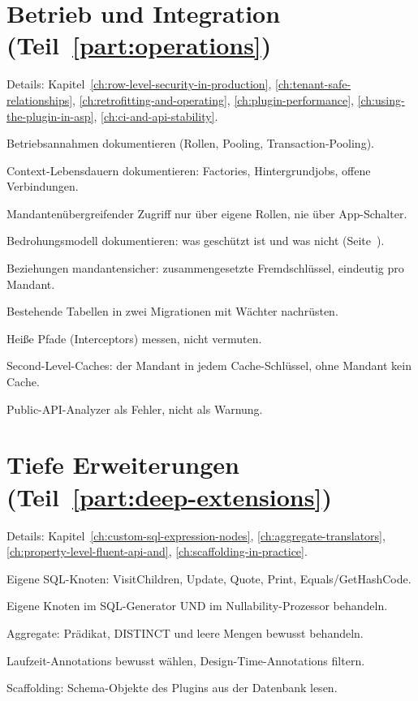 \section{Betrieb und Integration (Teil~\ref{part:operations})}

\noindent Details: Kapitel~\ref{ch:row-level-security-in-production}, \ref{ch:tenant-safe-relationships}, \ref{ch:retrofitting-and-operating}, \ref{ch:plugin-performance}, \ref{ch:using-the-plugin-in-asp}, \ref{ch:ci-and-api-stability}.

\begin{checklist}
  \item Betriebsannahmen dokumentieren (Rollen, Pooling, Transaction-Pooling).
  \item Context-Lebensdauern dokumentieren: Factories, Hintergrundjobs, offene Verbindungen.
  \item Mandantenübergreifender Zugriff nur über eigene Rollen, nie über App-Schalter.
  \item Bedrohungsmodell dokumentieren: was geschützt ist und was nicht
    (Seite~\pageref{sec:threat-model}).
  \item Beziehungen mandantensicher: zusammengesetzte Fremdschlüssel, eindeutig pro Mandant.
  \item Bestehende Tabellen in zwei Migrationen mit Wächter nachrüsten.
  \item Heiße Pfade (Interceptors) messen, nicht vermuten.
  \item Second-Level-Caches: der Mandant in jedem Cache-Schlüssel, ohne Mandant kein Cache.
  \item Public-API-Analyzer als Fehler, nicht als Warnung.
\end{checklist}

\section{Tiefe Erweiterungen (Teil~\ref{part:deep-extensions})}

\noindent Details: Kapitel~\ref{ch:custom-sql-expression-nodes}, \ref{ch:aggregate-translators}, \ref{ch:property-level-fluent-api-and}, \ref{ch:scaffolding-in-practice}.

\begin{checklist}
  \item Eigene SQL-Knoten: VisitChildren, Update, Quote, Print, Equals/GetHashCode.
  \item Eigene Knoten im SQL-Generator UND im Nullability-Prozessor behandeln.
  \item Aggregate: Prädikat, DISTINCT und leere Mengen bewusst behandeln.
  \item Laufzeit-Annotations bewusst wählen, Design-Time-Annotations filtern.
  \item Scaffolding: Schema-Objekte des Plugins aus der Datenbank lesen.
\end{checklist}


